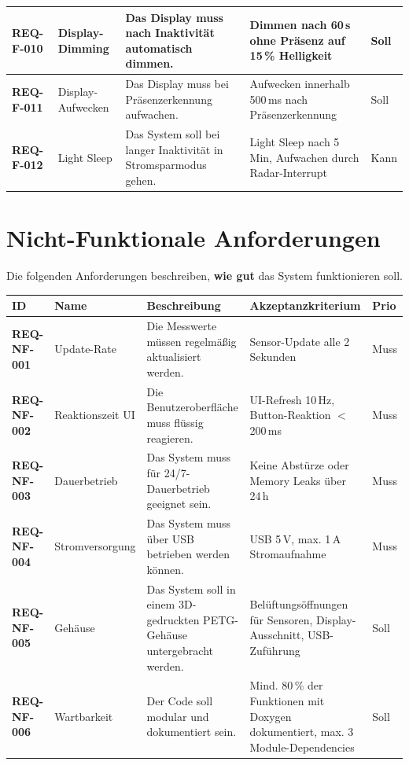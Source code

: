 \documentclass[a4paper,11pt]{article}
\begin{document}
\begin{longtable}{p{1.8cm} p{2.3cm} p{4cm} p{3.5cm} p{1cm}}
\textbf{REQ-F-010} & Display-Dimming & Das Display muss nach Inaktivität automatisch dimmen. & Dimmen nach 60\,s ohne Präsenz auf 15\,\% Helligkeit & Soll \\
\midrule

\textbf{REQ-F-011} & Display-Aufwecken & Das Display muss bei Präsenzerkennung aufwachen. & Aufwecken innerhalb 500\,ms nach Präsenzerkennung & Soll \\
\midrule

\textbf{REQ-F-012} & Light Sleep & Das System soll bei langer Inaktivität in Stromsparmodus gehen. & Light Sleep nach 5\,Min, Aufwachen durch Radar-Interrupt & Kann \\

\bottomrule
\end{longtable}

\section{Nicht-Funktionale Anforderungen}

Die folgenden Anforderungen beschreiben, \textbf{wie gut} das System funktionieren soll.

\begin{longtable}{p{1.8cm} p{2.3cm} p{4cm} p{3.5cm} p{1cm}}
\toprule
\rowcolor{tableheader}
\textbf{ID} & \textbf{Name} & \textbf{Beschreibung} & \textbf{Akzeptanzkriterium} & \textbf{Prio} \\
\midrule
\endhead

\textbf{REQ-NF-001} & Update-Rate & Die Messwerte müssen regelmäßig aktualisiert werden. & Sensor-Update alle 2 Sekunden & Muss \\
\midrule

\textbf{REQ-NF-002} & Reaktionszeit UI & Die Benutzeroberfläche muss flüssig reagieren. & UI-Refresh 10\,Hz, Button-Reaktion $<$200\,ms & Muss \\
\midrule

\textbf{REQ-NF-003} & Dauerbetrieb & Das System muss für 24/7-Dauerbetrieb geeignet sein. & Keine Abstürze oder Memory Leaks über 24\,h & Muss \\
\midrule

\textbf{REQ-NF-004} & Stromversorgung & Das System muss über USB betrieben werden können. & USB 5\,V, max. 1\,A Stromaufnahme & Muss \\
\midrule

\textbf{REQ-NF-005} & Gehäuse & Das System soll in einem 3D-gedruckten PETG-Gehäuse untergebracht werden. & Belüftungsöffnungen für Sensoren, Display-Ausschnitt, USB-Zuführung & Soll \\
\midrule

\textbf{REQ-NF-006} & Wartbarkeit & Der Code soll modular und dokumentiert sein. & Mind. 80\,\% der Funktionen mit Doxygen dokumentiert, max. 3 Module-Dependencies & Soll \\

\bottomrule
\end{longtable}
\end{document}
